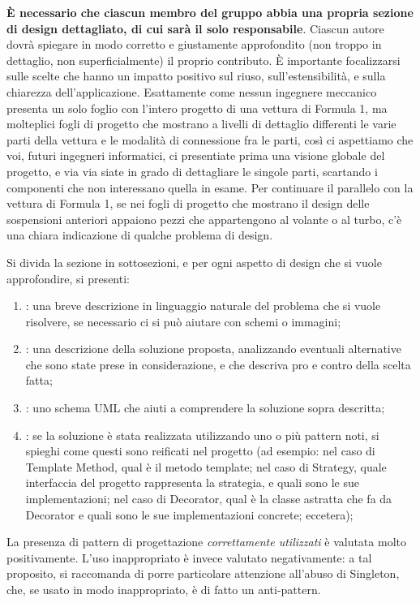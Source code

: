 \documentclass[a4paper,12pt]{report}
\begin{document}
\textbf{È necessario che ciascun membro del gruppo abbia una propria sezione di design dettagliato,
di cui sarà il solo responsabile}.
%
Ciascun autore dovrà spiegare in modo corretto e giustamente approfondito (non troppo in dettaglio, non superficialmente) il proprio contributo.
%
È importante focalizzarsi sulle scelte che hanno un impatto positivo sul riuso, sull'estensibilità, e sulla chiarezza dell'applicazione.
%
Esattamente come nessun ingegnere meccanico presenta un solo foglio con l'intero progetto di una vettura di Formula 1, ma molteplici fogli di progetto che mostrano a livelli di dettaglio differenti le varie parti della vettura e le modalità di connessione fra le parti, così ci aspettiamo che voi, futuri ingegneri informatici, ci presentiate prima una visione globale del progetto, e via via siate in grado di dettagliare le singole parti, scartando i componenti che non interessano quella in esame.
%
Per continuare il parallelo con la vettura di Formula 1, se nei fogli di progetto che mostrano il
design delle sospensioni anteriori appaiono pezzi che appartengono al volante o al turbo, c'è una
chiara indicazione di qualche problema di design.

Si divida la sezione in sottosezioni, e per ogni aspetto di design che si vuole approfondire, si presenti:
\begin{enumerate}
    \item: una breve descrizione in linguaggio naturale del problema che si vuole risolvere, se necessario ci si può aiutare con schemi o immagini;
    \item: una descrizione della soluzione proposta, analizzando eventuali alternative che sono state prese in considerazione, e che descriva pro e contro della scelta fatta;
    \item: uno schema UML che aiuti a comprendere la soluzione sopra descritta;
    \item: se la soluzione è stata realizzata utilizzando uno o più pattern noti, si spieghi come questi sono reificati nel progetto
    (ad esempio: nel caso di Template Method, qual è il metodo template;
    nel caso di Strategy, quale interfaccia del progetto rappresenta la strategia, e quali sono le sue implementazioni;
    nel caso di Decorator, qual è la classe astratta che fa da Decorator e quali sono le sue implementazioni concrete; eccetera);
\end{enumerate}
%
La presenza di pattern di progettazione \emph{correttamente utilizzati} è valutata molto positivamente.
%
L'uso inappropriato è invece valutato negativamente: a tal proposito, si raccomanda di porre particolare attenzione all'abuso di Singleton, che, se usato in modo inappropriato, è di fatto un anti-pattern.
\end{document}
